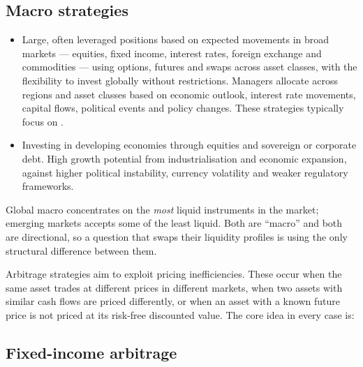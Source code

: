 \subsection{Macro strategies}

\begin{itemize}
\item {} Large, often leveraged positions based on expected
movements in broad markets --- equities, fixed income, interest rates, foreign
exchange and commodities --- using options, futures and swaps across asset
classes, with the flexibility to invest globally without restrictions. Managers
allocate across regions and asset classes based on economic outlook, interest
rate movements, capital flows, political events and policy changes. These
strategies typically focus on .
\item {} Investing in developing economies through equities
and sovereign or corporate debt. High growth potential from industrialisation and
economic expansion, against higher political instability, currency volatility and
weaker regulatory frameworks.
\end{itemize}

\begin{imtrapbox}[breakable=false,title={Liquidity runs the opposite way in the two macro strategies}]
Global macro concentrates on the \emph{most} liquid instruments in the market;
emerging markets accepts some of the least liquid. Both are ``macro'' and both
are directional, so a question that swaps their liquidity profiles is using the
only structural difference between them.
\end{imtrapbox}


Arbitrage strategies aim to exploit pricing inefficiencies. These occur when the
same asset trades at different prices in different markets, when two assets with
similar cash flows are priced differently, or when an asset with a known future
price is not priced at its risk-free discounted value. The core idea in every
case is: 

\subsection{Fixed-income arbitrage}

